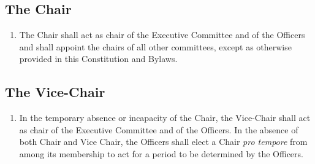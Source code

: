 \subsection{The Chair}
\begin{enumerate}
	\item The Chair shall act as chair of the Executive Committee and of the Officers and shall appoint the chairs of all other committees, except as otherwise provided in this Constitution and Bylaws.
\end{enumerate}

\subsection{The Vice-Chair}
\begin{enumerate}
	\item In the temporary absence or incapacity of the Chair, the Vice-Chair shall act as chair of the Executive Committee and of the Officers. In the absence of both Chair and Vice Chair, the Officers shall elect a Chair \textit{pro tempore} from among its membership to act for a period to be determined by the Officers.
\end{enumerate}


